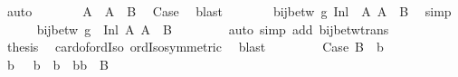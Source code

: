 \begin{isabellebody}
\ auto\isanewline
\ \ \ \ \isamarkupfalse%
\ \isamarkupfalse%
\ {\isachardoublequoteopen}{\isacharquery}{\kern0pt}A{\isacharprime}{\kern0pt}\ {\isacharequal}{\kern0pt}\ A\ {\isacharless}{\kern0pt}{\isacharplus}{\kern0pt}{\isachargreater}{\kern0pt}\ B{\isachardoublequoteclose}\ \isamarkupfalse%
\ Case{}\ \isamarkupfalse%
\ blast\isanewline
\ \ \ \ \isamarkupfalse%
\ \isamarkupfalse%
\ {\isachardoublequoteopen}bij{\isacharunderscore}{\kern0pt}betw\ g\ {\isacharparenleft}{\kern0pt}{\isacharquery}{\kern0pt}Inl\ {\isacharbackquote}{\kern0pt}\ A{\isacharparenright}{\kern0pt}\ {\isacharparenleft}{\kern0pt}A\ {\isacharless}{\kern0pt}{\isacharplus}{\kern0pt}{\isachargreater}{\kern0pt}\ B{\isacharparenright}{\kern0pt}{\isachardoublequoteclose}\ \isamarkupfalse%
\ simp\isanewline
\ \ \ \ \isamarkupfalse%
\ {\isachardoublequoteopen}bij{\isacharunderscore}{\kern0pt}betw\ {\isacharparenleft}{\kern0pt}g\ {\isasymcirc}\ {\isacharquery}{\kern0pt}Inl{\isacharparenright}{\kern0pt}\ A\ {\isacharparenleft}{\kern0pt}A\ {\isacharless}{\kern0pt}{\isacharplus}{\kern0pt}{\isachargreater}{\kern0pt}\ B{\isacharparenright}{\kern0pt}{\isachardoublequoteclose}\isanewline
\ \ \ \ \isamarkupfalse%
\ {}\ \isamarkupfalse%
\ {\isacharparenleft}{\kern0pt}auto\ simp\ add{\isacharcolon}{\kern0pt}\ bij{\isacharunderscore}{\kern0pt}betw{\isacharunderscore}{\kern0pt}trans{\isacharparenright}{\kern0pt}\isanewline
\ \ \ \ \isamarkupfalse%
\ {\isacharquery}{\kern0pt}thesis\ \isamarkupfalse%
\ card{\isacharunderscore}{\kern0pt}of{\isacharunderscore}{\kern0pt}ordIso\ ordIso{\isacharunderscore}{\kern0pt}symmetric\ \isamarkupfalse%
\ blast\isanewline
\ \ \isamarkupfalse%
\isanewline
\ \ \ \ \isamarkupfalse%
\ Case{}{\isacharcolon}{\kern0pt}\ {\isachardoublequoteopen}B\ {\isasymnoteq}\ {\isacharbraceleft}{\kern0pt}b{}{\isacharbraceright}{\kern0pt}{\isachardoublequoteclose}\isanewline
\ \ \ \ \isamarkupfalse%
\ {\isacharasterisk}{\kern0pt}\ {}\ \isamarkupfalse%
\ b{}\ \ {}{\isacharcolon}{\kern0pt}\ {\isachardoublequoteopen}b{}\ {\isasymnoteq}\ b{}\ {\isasymand}\ {\isacharbraceleft}{\kern0pt}b{}{\isacharcomma}{\kern0pt}b{}{\isacharbraceright}{\kern0pt}\ {\isasymle}\ B{\isachardoublequoteclose}\ \isamarkupfalse%

\end{isabellebody}
